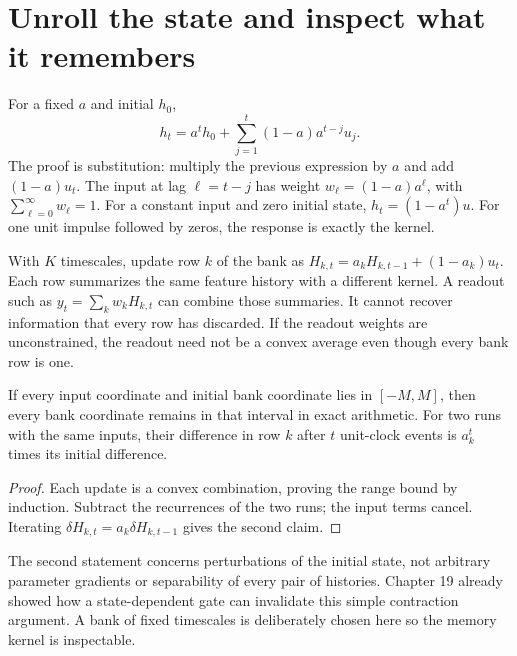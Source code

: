 \section{Unroll the state and inspect what it remembers}

For a fixed $a$ and initial $h_0$,
\begin{equation}
 h_t=a^t h_0+\sum_{j=1}^{t}(1-a)a^{t-j}u_j.
 \label{eq:kernel}
\end{equation}
The proof is substitution: multiply the previous expression by $a$ and add
$(1-a)u_t$. The input at lag $\ell=t-j$ has weight
$w_\ell=(1-a)a^\ell$, with $\sum_{\ell=0}^{\infty}w_\ell=1$.
For a constant input and zero initial state, $h_t=(1-a^t)u$.
For one unit impulse followed by zeros, the response is exactly the kernel.


With $K$ timescales, update row $k$ of the bank as
$H_{k,t}=a_kH_{k,t-1}+(1-a_k)u_t$. Each row summarizes the same feature
history with a different kernel. A readout such as
$y_t=\sum_k w_kH_{k,t}$ can combine those summaries. It cannot recover
information that every row has discarded. If the readout weights are
unconstrained, the readout need not be a convex average even though every
bank row is one.

\begin{proposition}
If every input coordinate and initial bank coordinate lies in $[-M,M]$,
then every bank coordinate remains in that interval in exact arithmetic.
For two runs with the same inputs, their difference in row $k$ after $t$
unit-clock events is $a_k^t$ times its initial difference.
\end{proposition}
\begin{proof}
Each update is a convex combination, proving the range bound by induction.
Subtract the recurrences of the two runs; the input terms cancel.
Iterating $\delta H_{k,t}=a_k\delta H_{k,t-1}$ gives the second claim.
\end{proof}

The second statement concerns perturbations of the initial state, not
arbitrary parameter gradients or separability of every pair of histories.
Chapter 19 already showed how a state-dependent gate can invalidate this
simple contraction argument. A bank of fixed timescales is deliberately
chosen here so the memory kernel is inspectable.

